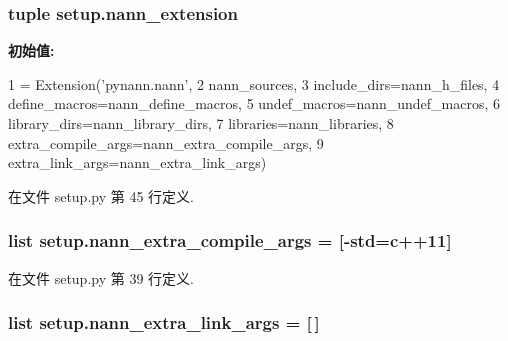 \subsubsection[{nann\+\_\+extension}]{\setlength{\rightskip}{0pt plus 5cm}tuple setup.\+nann\+\_\+extension}\label{namespacesetup_aebabf02abf54d1e0cd11949d52c28be5}
{\bfseries 初始值\+:}
\begin{DoxyCode}
1 = Extension(\textcolor{stringliteral}{'pynann.nann'},
2                            nann\_sources,
3                            include\_dirs=nann\_h\_files,
4                            define\_macros=nann\_define\_macros,
5                            undef\_macros=nann\_undef\_macros,
6                            library\_dirs=nann\_library\_dirs,
7                            libraries=nann\_libraries,
8                            extra\_compile\_args=nann\_extra\_compile\_args,
9                            extra\_link\_args=nann\_extra\_link\_args)
\end{DoxyCode}


在文件 setup.\+py 第 45 行定义.

\hypertarget{namespacesetup_a0856af7a2cf5373d7ba13fb91d69da14}{}
\subsubsection[{nann\+\_\+extra\+\_\+compile\+\_\+args}]{\setlength{\rightskip}{0pt plus 5cm}list setup.\+nann\+\_\+extra\+\_\+compile\+\_\+args = \mbox{[}\textquotesingle{}-\/std=c++11\textquotesingle{}\mbox{]}}\label{namespacesetup_a0856af7a2cf5373d7ba13fb91d69da14}


在文件 setup.\+py 第 39 行定义.

\hypertarget{namespacesetup_a91c749571f0ed8408640cf8729aa9d7a}{}
\subsubsection[{nann\+\_\+extra\+\_\+link\+\_\+args}]{\setlength{\rightskip}{0pt plus 5cm}list setup.\+nann\+\_\+extra\+\_\+link\+\_\+args = \mbox{[}$\,$\mbox{]}}\label{namespacesetup_a91c749571f0ed8408640cf8729aa9d7a}


